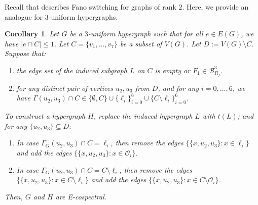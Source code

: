 \documentclass[12pt]{article}
\numberwithin{equation}{section}
\newtheorem{corollary}[theorem]{Corollary}
\theoremstyle{definition}
\newcommand{\ev}[1]{( #1 )}
\begin{document}
Recall that \cite[Theorem 25, p.~19]{abiad_berg_simoens} describes Fano switching for graphs of rank $2$. Here, we provide an analogue for $3$-uniform hypergraphs. 
\begin{corollary}
Let $G$ be a $3$-uniform hypergraph such that for all $e \in E\ev{G}$, we have $|e\cap C| \leq 1$. Let $C=\{ v_1,\ldots,v_7 \}$ be a subset of $V\ev{G}$. Let $D:= V\ev{G}\setminus C$. 
Suppose that:
\begin{enumerate}
\item[\textit{(i)}] the edge set of the induced subgraph $L$ on $C$ is empty or $F_1 \in \mathcal{B}^{3}_{R_f}$. 
\item[\textit{(ii)}] for any distinct pair of vertices $u_2, u_3$ from $D$, and for any $i=0,\ldots,6$, we have $\Gamma(u_2,u_3) \cap C \in \{ \emptyset, C \} \cup \{ \ell_i \}_{i=0}^{6} \cup \{ C\setminus \ell_i \}_{i=0}^{6}  $. 
\end{enumerate}
To construct a hypergraph $H$, replace the induced hypergraph $L$ with $t\ev{L}$; and for any $\{ u_2, u_3 \} \subseteq D$:
\begin{enumerate}
\item In case $\Gamma_G(u_2, u_3) \cap C = \ell_i$, then remove the edges $ \{ \{ x, u_2, u_3\} : x\in \ell_i \}$ and add the edges $ \{ \{ x, u_2, u_3\} : x\in \mathcal{O}_{i} \}$. 
\item In case $\Gamma_G(u_2, u_3) \cap C = C \setminus \ell_i$, then remove the edges $ \{ \{ x, u_2, u_3\} : x\in C \setminus \ell_i \}$ and add the edges $ \{ \{ x, u_2, u_3\} : x\in C \setminus \mathcal{O}_{i} \}$. 
\end{enumerate}
Then, $G$ and $H$ are E-cospectral. 
\end{corollary}
\end{document}

